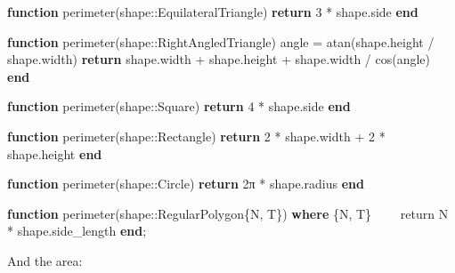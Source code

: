 \documentclass[
]{article}
\newenvironment{Shaded}{\begin{snugshade}}{\end{snugshade}}
\newcommand{\ControlFlowTok}[1]{\textcolor[rgb]{0.00,0.23,0.31}{\textbf{#1}}}
\newcommand{\DataTypeTok}[1]{\textcolor[rgb]{0.68,0.00,0.00}{#1}}
\newcommand{\FloatTok}[1]{\textcolor[rgb]{0.68,0.00,0.00}{#1}}
\newcommand{\FunctionTok}[1]{\textcolor[rgb]{0.28,0.35,0.67}{#1}}
\newcommand{\KeywordTok}[1]{\textcolor[rgb]{0.00,0.23,0.31}{\textbf{#1}}}
\newcommand{\NormalTok}[1]{\textcolor[rgb]{0.00,0.23,0.31}{#1}}
\newcommand{\OperatorTok}[1]{\textcolor[rgb]{0.37,0.37,0.37}{#1}}
\begin{document}
\begin{Shaded}
\begin{Highlighting}[]
\KeywordTok{function} \FunctionTok{perimeter}\NormalTok{(shape}\OperatorTok{::}\DataTypeTok{EquilateralTriangle}\NormalTok{)}
   \ControlFlowTok{return} \FloatTok{3} \OperatorTok{*}\NormalTok{ shape.side}
\KeywordTok{end}

\KeywordTok{function} \FunctionTok{perimeter}\NormalTok{(shape}\OperatorTok{::}\DataTypeTok{RightAngledTriangle}\NormalTok{)}
\NormalTok{   angle }\OperatorTok{=} \FunctionTok{atan}\NormalTok{(shape.height }\OperatorTok{/}\NormalTok{ shape.width)}
   \ControlFlowTok{return}\NormalTok{ shape.width }\OperatorTok{+}\NormalTok{ shape.height }\OperatorTok{+}\NormalTok{ shape.width }\OperatorTok{/} \FunctionTok{cos}\NormalTok{(angle)}
\KeywordTok{end}

\KeywordTok{function} \FunctionTok{perimeter}\NormalTok{(shape}\OperatorTok{::}\DataTypeTok{Square}\NormalTok{)}
   \ControlFlowTok{return} \FloatTok{4} \OperatorTok{*}\NormalTok{ shape.side}
\KeywordTok{end}

\KeywordTok{function} \FunctionTok{perimeter}\NormalTok{(shape}\OperatorTok{::}\DataTypeTok{Rectangle}\NormalTok{)}
   \ControlFlowTok{return} \FloatTok{2} \OperatorTok{*}\NormalTok{ shape.width }\OperatorTok{+} \FloatTok{2} \OperatorTok{*}\NormalTok{ shape.height}
\KeywordTok{end}

\KeywordTok{function} \FunctionTok{perimeter}\NormalTok{(shape}\OperatorTok{::}\DataTypeTok{Circle}\NormalTok{)}
   \ControlFlowTok{return} \FloatTok{2}\NormalTok{π }\OperatorTok{*}\NormalTok{ shape.radius}
\KeywordTok{end}

\KeywordTok{function} \FunctionTok{perimeter}\NormalTok{(shape}\OperatorTok{::}\DataTypeTok{RegularPolygon\{N, T\}}\NormalTok{) }\KeywordTok{where}\NormalTok{ \{N, T\}}
\NormalTok{    return N }\OperatorTok{*}\NormalTok{ shape.side\_length}
\KeywordTok{end}\NormalTok{;}
\end{Highlighting}
\end{Shaded}

And the area:
\end{document}
